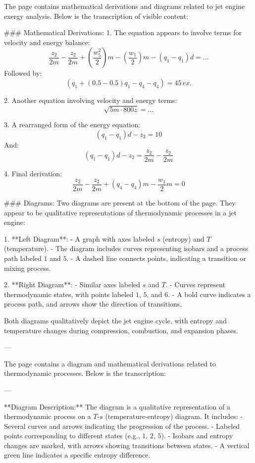 The page contains mathematical derivations and diagrams related to jet engine exergy analysis. Below is the transcription of visible content:

### Mathematical Derivations:
1. The equation appears to involve terms for velocity and energy balance:
   \[
   \frac{z_2}{2m} - \frac{z_2}{2m} + \left( \frac{w_5^2}{2} \right) m - \left( \frac{w_1}{2} \right) m - (q_1 - q_1) d = \ldots
   \]
   Followed by:
   \[
   (q_1 + (0.5 - 0.5) q_1 - q_4 - q_4) = 45 \, ex.
   \]

2. Another equation involving velocity and energy terms:
   \[
   \sqrt{5m \cdot 800z} = \ldots
   \]

3. A rearranged form of the energy equation:
   \[
   (q_1 - q_1) d - z_2 = 10
   \]
   And:
   \[
   (q_1 - q_1) d - z_2 = \frac{z_2}{2m} - \frac{z_2}{2m}
   \]

4. Final derivation:
   \[
   \frac{z_2}{2m} - \frac{z_2}{2m} + (q_4 - q_4) m - \frac{w_1}{2} m = 0
   \]

### Diagrams:
Two diagrams are present at the bottom of the page. They appear to be qualitative representations of thermodynamic processes in a jet engine:

1. **Left Diagram**:  
   - A graph with axes labeled \( s \) (entropy) and \( T \) (temperature).  
   - The diagram includes curves representing isobars and a process path labeled \( 1 \) and \( 5 \).  
   - A dashed line connects points, indicating a transition or mixing process.  

2. **Right Diagram**:  
   - Similar axes labeled \( s \) and \( T \).  
   - Curves represent thermodynamic states, with points labeled \( 1 \), \( 5 \), and \( 6 \).  
   - A bold curve indicates a process path, and arrows show the direction of transitions.  

Both diagrams qualitatively depict the jet engine cycle, with entropy and temperature changes during compression, combustion, and expansion phases.

---

The page contains a diagram and mathematical derivations related to thermodynamic processes. Below is the transcription:

---

**Diagram Description:**
The diagram is a qualitative representation of a thermodynamic process on a \( T \)-\( s \) (temperature-entropy) diagram. It includes:
- Several curves and arrows indicating the progression of the process.
- Labeled points corresponding to different states (e.g., \( 1 \), \( 2 \), \( 5 \)).
- Isobars and entropy changes are marked, with arrows showing transitions between states.
- A vertical green line indicates a specific entropy difference.

